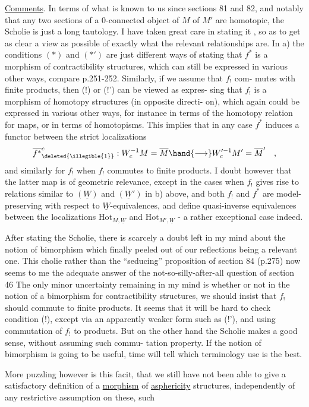 
\uline{Comments}. In terms of what is known to us since sections 81 and 82,
and notably that any two sections of a 0-connected object of $M$  of $M'$
are homotopic, the Scholie is just a long tautology. I have taken
great care in stating it , so as to get as clear a view as possible of
exactly what the relevant relationships are. In a) the conditions
$(*)$ and $(*')$ are just different ways of stating that $f^*$ is a morphism
of contractibility structures, which can still be expressed in various
other ways, compare p.251-252. Similarly, if we assume that $f_!$ com-%
mutes with finite products, then (!) or (!') can be viewed as expres-%
sing that $f_!$ is a morphism of homotopy structures (in opposite directi-%
on), which again could be expressed in various other ways, for instance
in terms of the homotopy relation for maps, or in terms of homotopisms.
This implies that in any case $f^*$ induces a  functor between
the strict localizations
\[ \overline{f^*}^{c}_{\deleted{\illegible{1}}} : W_c^{-1}M = \overline{M} \hand{\longrightarrow} W'^{-1}_cM' = \overline{M}' \quad , \]
and similarly for $f_!$ when $f_!$ commutes to finite products. I doubt
however that the latter map is of geometric relevance, except in the
cases when  $f_!$ gives rise to relations similar to $(\underline{W})$ and $(\underline{W}')$ in
b) above, and both $f_!$ and $f^*$ are model-preserving with respect to
$\underline{W}$-equivalences, and define quasi-inverse equivalences between the
localizations $\mathrm{Hot}_{M,\underline{W}}$ and $\mathrm{Hot}_{M',\underline{W}}$ - a rather exceptional case indeed.

After stating the Scholie, there is scarcely a doubt left in my
mind about the notion of bimorphism which finally peeled out of our
reflections being a relevant one. This cholie\hand{,}  rather than
the ``seducing'' proposition of section 84 (p.275)\hand{,} now seems to me the
adequate answer of the not-so-silly-after-all question of section 46
The only minor uncertainty remaining in my mind is whether or not in
the notion of a bimorphism for contractibility structures, we should
insist that $f_!$ should commute to finite products. It seems that it
will be hard to check condition (!), except via an apparently weaker
form such as (!'), and using commutation of $f_!$ to products. But on the
other hand the Scholie makes a good sense, without assuming such commu-%
tation property. If the notion of  bimorphism is going to be useful,
time will tell which terminology use is the best.

More puzzling  however is this facit, that we still have not
been able to give a satisfactory definition of a \uline{morphism} of \uline{asphericity}
structures, independently of any restrictive assumption on these, such

